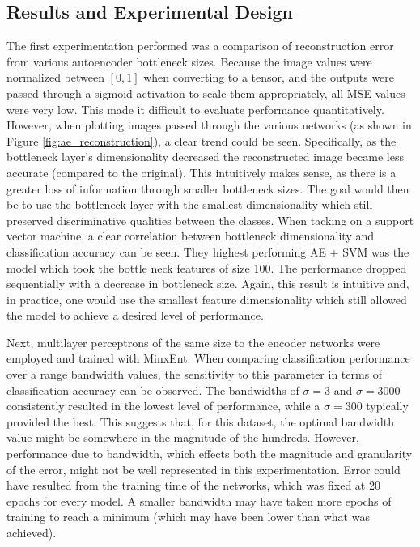 \documentclass[conference]{IEEEtran}
\begin{document}
\subsection{Results and Experimental Design}

The first experimentation performed was a comparison of reconstruction error from various autoencoder bottleneck sizes.  Because the image values were normalized between $[0,1]$ when converting to a tensor, and the outputs were passed through a sigmoid activation to scale them appropriately, all MSE values were very low.  This  made it difficult to evaluate performance quantitatively.  However, when plotting images passed through the various networks (as shown in Figure \ref{fig:ae_reconstruction}), a clear trend could be seen.  Specifically, as the bottleneck layer's dimensionality decreased the reconstructed image became less accurate (compared to the original).  This intuitively makes sense, as there is a greater loss of information through smaller bottleneck sizes.  The goal would then be to use the bottleneck layer with the smallest dimensionality which still preserved discriminative qualities between the classes. When tacking on a support vector machine, a clear correlation between bottleneck dimensionality and classification accuracy can be seen.  They highest performing AE + SVM was the model which took the bottle neck features of size 100.  The performance dropped sequentially with a decrease in bottleneck size.  Again, this result is intuitive and, in practice, one would use the smallest feature dimensionality which still allowed the model to achieve a desired level of performance.

Next, multilayer perceptrons  of the same size to the encoder networks were employed and trained with MinxEnt.  When comparing classification performance over a range bandwidth values, the sensitivity to this parameter in terms of classification accuracy can be observed. The bandwidths of $\sigma=3$ and $\sigma=3000$ consistently resulted in the lowest  level of performance, while a $\sigma=300$ typically provided the best.  This suggests that, for this dataset, the optimal bandwidth value might be somewhere in the magnitude of the hundreds.  However, performance due to bandwidth, which effects both the magnitude and granularity of the error, might not be well represented in this experimentation.  Error could have resulted from the training time of the networks, which was fixed at 20 epochs for every model.  A smaller bandwidth may have taken more epochs of training to reach a minimum (which may have been lower than what was achieved).
\end{document}
